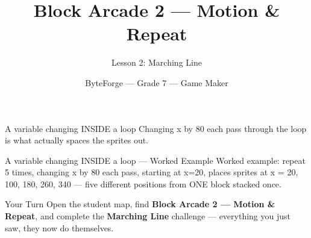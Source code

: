 \documentclass[aspectratio=169]{beamer}
\title{Block Arcade 2 — Motion \& Repeat}
\subtitle{Lesson 2: Marching Line}
\author{ByteForge --- Grade 7 --- Game Maker}
\date{}
\begin{document}
\begin{frame}
    \titlepage
\end{frame}

\begin{frame}{A variable changing INSIDE a loop}
    \Large
    Changing x by 80 each pass through the loop is what actually spaces the sprites out.
\end{frame}

\begin{frame}{A variable changing INSIDE a loop --- Worked Example}
    \Large
    Worked example: repeat 5 times, changing x by 80 each pass, starting at x=20, places sprites at x = 20, 100, 180, 260, 340 — five different positions from ONE block stacked once.
\end{frame}

\begin{frame}{Your Turn}
    \Large
    Open the student map, find \textbf{Block Arcade 2 — Motion \& Repeat}, and complete
    the \textbf{Marching Line} challenge --- everything you just saw, they now do themselves.
\end{frame}
\end{document}

